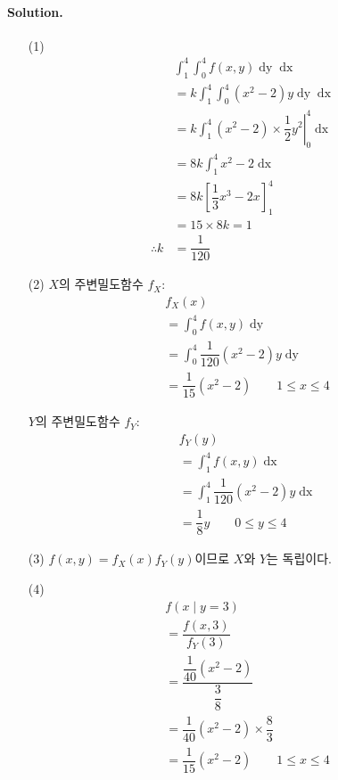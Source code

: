 \paragraph{Solution.} \begin{itemize}
  \item [(1)] \begin{align*}
	& \int_1^4 \int_0^4 f\left(x, y\right) \mathop{dy} \mathop{dx} \\
	&= k \int_1^4 \int_0^4 \left(x^2-2\right)y \mathop{dy} \mathop{dx} \\
	&= k \int_1^4 \left(x^2-2\right)\times \left.\dfrac{1}{2}y^2\right|_0^4 \mathop{dx} \\
	&= 8k \int_1^4 x^2-2 \mathop{dx} \\
	&= 8k\left[\dfrac{1}{3}x^3-2x\right]_1^4 \\
	&= 15\times 8k = 1\\
	\therefore k&=\dfrac{1}{120}
\end{align*}

  \item [(2)] $X$의 주변밀도함수 $f_X$:
\begin{align*}
	& f_X\left(x\right) \\
	&= \int_0^4 f\left(x, y\right) \mathop{dy} \\
	&= \int_0^4 \dfrac{1}{120}\left(x^2-2\right)y \mathop{dy} \\
	&= \dfrac{1}{15}\left(x^2-2\right) \qquad 1\leq x\leq 4
\end{align*}

$Y$의 주변밀도함수 $f_Y$:
\begin{align*}
	& f_Y\left(y\right) \\
	&= \int_1^4 f\left(x, y\right) \mathop{dx} \\
	&= \int_1^4 \dfrac{1}{120}\left(x^2-2\right)y \mathop{dx} \\
	&= \dfrac{1}{8}y \qquad 0\leq y\leq 4
\end{align*}
  \item [(3)] $f\left(x, y\right)=f_X\left(x\right)f_Y\left(y\right)$이므로 $X$와 $Y$는 독립이다.
  \item [(4)]
\begin{align*}
	& f\left(x\middle|y=3\right) \\
	&= \dfrac{f\left(x, 3\right)}{f_Y\left(3\right)} \\
	&= \dfrac{\dfrac{1}{40}\left(x^2-2\right)}{\dfrac{3}{8}} \\
	&= \dfrac{1}{40}\left(x^2-2\right)\times\dfrac{8}{3} \\
	&= \dfrac{1}{15}\left(x^2-2\right) \qquad 1\leq x\leq 4
\end{align*}
\end{itemize}

